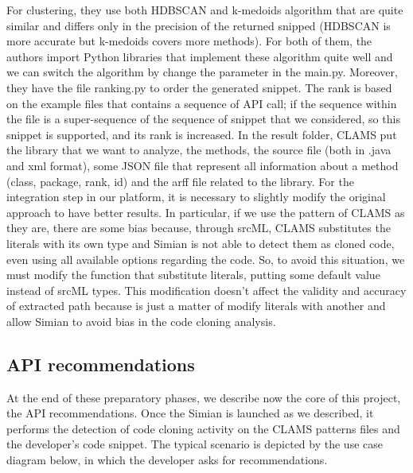 For clustering, they use both HDBSCAN and k-medoids algorithm that are quite similar and differs only in the precision of the returned snipped (HDBSCAN is more accurate but k-medoids covers more methods). For both of them, the authors import Python libraries that implement these algorithm quite well and we can switch the algorithm by change the parameter in the main.py. Moreover, they have the file ranking.py to order the generated snippet. The rank is based on the example files that contains a sequence of API call; if the sequence within the file is a super-sequence of the sequence of snippet that we considered, so this snippet is supported, and its rank is increased. In the result folder, CLAMS put the library that we want to analyze, the methods, the source file (both in .java and xml format), some JSON file that represent all information about a method (class, package, rank, id) and the arff file related to the library. \newline
For the integration step in our platform, it is necessary to slightly modify the original approach to have better results. In particular, if we use the pattern of CLAMS as they are, there are some bias because, through srcML, CLAMS substitutes the literals with its own type and Simian is not able to detect them as cloned code, even using all available options regarding the code. So, to avoid this situation, we must modify the function that substitute literals, putting some default value instead of srcML types. This modification doesn't affect the validity and accuracy of extracted path because is just a matter of modify literals with another and allow Simian to avoid bias in the code cloning analysis.

\subsection{API recommendations}
At the end of these preparatory phases, we describe now the core of this project, the API recommendations. Once the Simian is launched as we described, it performs the detection of code cloning activity on the CLAMS patterns files and the developer's code snippet. The typical scenario is depicted by the use case diagram below, in which the developer asks for recommendations.


